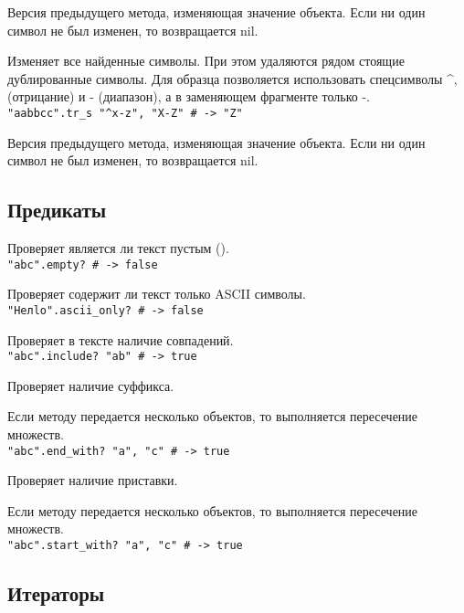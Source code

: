 \begin{methodlist}
  Версия предыдущего метода, изменяющая значение объекта. Если ни один символ не был изменен, то возвращается nil.

  Изменяет все найденные символы. При этом удаляются рядом стоящие дублированные символы. Для образца позволяется использовать спецсимволы \textasciicircum\-, (отрицание) и - (диапазон), а в заменяющем фрагменте только -.
  \\\verb!"aabbcc".tr_s "^x-z", "X-Z" # -> "Z"!

  Версия предыдущего метода, изменяющая значение объекта. Если ни один символ не был изменен, то возвращается nil.
\end{methodlist}

\subsection*{Предикаты}

\begin{methodlist}
  Проверяет является ли текст пустым ().
  \\\verb!"abc".empty? # -> false!

  Проверяет содержит ли текст только ASCII символы.
  \\\verb!"Heлlo".ascii_only? # -> false!

  Проверяет в тексте наличие совпадений. 
  \\\verb!"abc".include? "ab" # -> true!

  Проверяет наличие суффикса. 

  Если методу передается несколько объектов, то выполняется пересечение множеств.
  \\\verb!"abc".end_with? "a", "c" # -> true!

  Проверяет наличие приставки. 

  Если методу передается несколько объектов, то выполняется пересечение множеств.
  \\\verb!"abc".start_with? "a", "c" # -> true!
\end{methodlist}

\subsection*{Итераторы}

